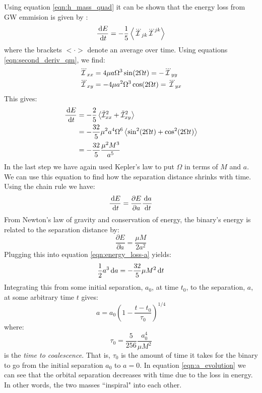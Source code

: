 Using equation \ref{eqn:h_mass_quad} it can be shown that the energy loss from \ac{GW} emmision is given by \cite{ref:BlanfordThorne}:
\begin{equation}
\label{eqn:energy_loss-t}
\frac{\d E}{\d t} = -\frac{1}{5}\left< \dddot{\qI}_{jk} \dddot{\qI}^{jk} \right>
\end{equation}
where the brackets $<\cdot>$ denote an average over time. Using equations \ref{eqn:second_deriv_qm}, we find:
\begin{align*}
\dddot{\mathcal{I}}_{xx} &= 4 \mu a \Omega^3\sin(2\Omega t) = -\dddot{\mathcal{I}}_{yy} \\
\dddot{\mathcal{I}}_{xy} &= -4 \mu a^2 \Omega^3\cos(2\Omega t) = \dddot{\mathcal{I}}_{yx}
\end{align*}
This gives:
\begin{align*}
\frac{\,\mathrm{d} E}{\,\mathrm{d} t} &= -\frac{2}{5}\left< \ddot{\mathcal{I}}_{xx}^2 + \ddot{\mathcal{I}}_{xy}^2 \right> \\
    &= -\frac{32}{5} \mu^2 a^4 \Omega^6 \left< \sin^2(2\Omega t) + \cos^2(2\Omega t) \right> \\
    &= -\frac{32}{5} \frac{\mu^2 M^3}{a^5}
\end{align*}
In the last step we have again used Kepler's law to put $\Omega$ in terms of $M$ and $a$. We can use this equation to find how the separation distance shrinks with time. Using the chain rule we have:
\begin{equation}
\label{eqn:energy_loss-a}
\frac{\d E}{\d t} = \frac{\partial E}{\partial a}\frac{\d a}{\d t}
\end{equation}
From Newton's law of gravity and conservation of energy, the binary's energy is related to the separation distance by:
\begin{equation*}
\frac{\partial E}{\partial a} = \frac{\mu M}{2a^2}
\end{equation*}
Plugging this into equation \ref{eqn:energy_loss-a} yields:
\begin{equation*}
\frac{1}{2} a^3 \,\mathrm{d} a = -\frac{32}{5} \mu M^2 \,\mathrm{d} t
\end{equation*}
Integrating this from some initial separation, $a_0$, at time $t_0$, to the separation, $a$, at some arbitrary time $t$ gives:
\begin{equation}
\label{eqn:a_evolution}
a = a_0 \left(1 - \frac{t-t_0}{\tau_0} \right)^{1/4}
\end{equation}
where:
\begin{equation}
\label{eqn:tau_0-a}
\tau_0 = \frac{5}{256} \frac{a_0^4}{\mu M^2}
\end{equation}
is the \emph{time to coalescence}. That is, $\tau_0$ is the amount of time it takes for the binary to go from the initial separation $a_0$ to $a=0$. In equation \ref{eqn:a_evolution} we can see that the orbital separation decreases with time due to the loss in energy. In other words, the two masses ``inspiral" into each other.

